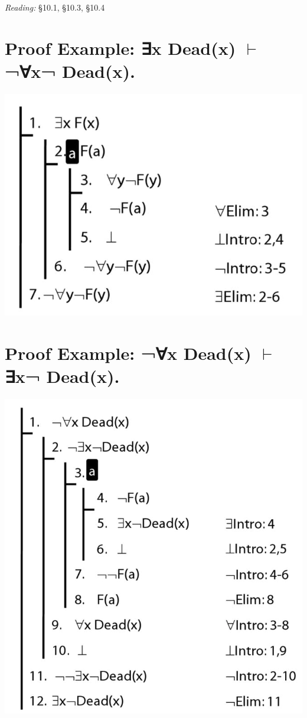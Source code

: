 \documentclass[12pt]{extarticle}
\begin{document}
\begin{multicols*}{3}
\emph{Reading:} §10.1, §10.3, §10.4
 
 
 
\section{Proof Example: ∃x Dead(x) $\vdash$ ¬∀x¬ Dead(x).}
 
\begin{center}
\includegraphics[scale=0.3]{img/unit_825_proof.png}
\end{center}
 
 
\section{Proof Example: ¬∀x Dead(x) $\vdash$ ∃x¬ Dead(x).}
 
\begin{center}
\includegraphics[scale=0.3]{img/unit_826_proof.png}
\end{center}
 

\end{multicols*}
\end{document}
